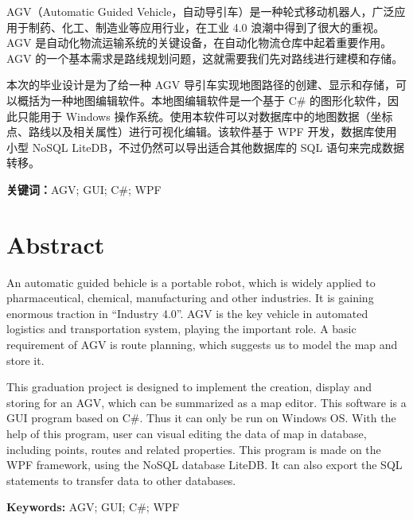 
AGV（Automatic Guided Vehicle，自动导引车）是一种轮式移动机器人，广泛应用于制药、化工、制造业等应用行业，在工业 4.0 浪潮中得到了很大的重视。AGV 是自动化物流运输系统的关键设备，在自动化物流仓库中起着重要作用。AGV 的一个基本需求是路线规划问题，这就需要我们先对路线进行建模和存储。

本次的毕业设计是为了给一种 AGV 导引车实现地图路径的创建、显示和存储，可以概括为一种地图编辑软件。本地图编辑软件是一个基于 C\# 的图形化软件，因此只能用于 Windows 操作系统。使用本软件可以对数据库中的地图数据（坐标点、路线以及相关属性）进行可视化编辑。该软件基于 WPF 开发，数据库使用小型 NoSQL LiteDB，不过仍然可以导出适合其他数据库的 SQL 语句来完成数据转移。

\bigskip

\textbf{关键词：}AGV; GUI; C\#; WPF

\newpage

\chapter*{Abstract}

An automatic guided behicle is a portable robot, which is widely applied to pharmaceutical, chemical, manufacturing and other industries. It is gaining enormous traction in ``Industry 4.0''. AGV is the key vehicle in automated logistics and transportation system, playing the important role. A basic requirement of AGV is route planning, which suggests us to model the map and store it.

This graduation project is designed to implement the creation, display and storing for an AGV, which can be summarized as a map editor. This software is a GUI program based on C\#. Thus it can only be run on Windows OS. With the help of this program, user can visual editing the data of map in database, including points, routes and related properties. This program is made on the WPF framework, using the NoSQL database LiteDB. It can also export the SQL statements to transfer data to other databases.

\bigskip

\textbf{Keywords:} AGV; GUI; C\#; WPF
